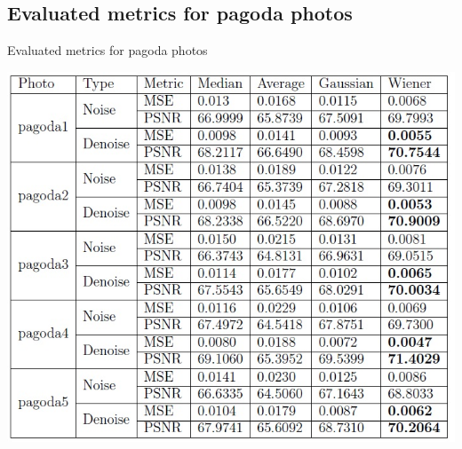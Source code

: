 \documentclass{beamer}
\begin{document}
\subsection{Evaluated metrics for pagoda photos
}
\begin{frame}{Evaluated metrics for pagoda photos
}
\begin{center}
\includegraphics{pag1.jpg}
\end{center}
\end{frame}
\end{document}

